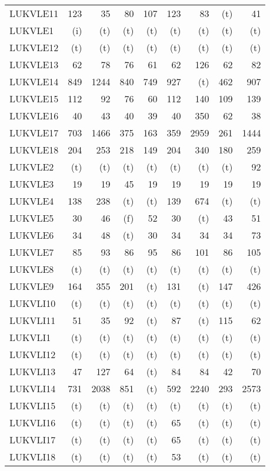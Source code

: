 \documentclass[11pt,twoside]{article}
\begin{document}
{\begin{longtable}[c]{|l|r|r|r|r|r|r|r|r|}
 LUKVLE11 & 123 & 35 & 80 & 107 & 123 & 83 & (t) & 41 \\
 LUKVLE1 & (i) & (t) & (t) & (t) & (t) & (t) & (t) & (t) \\
 LUKVLE12 & (t) & (t) & (t) & (t) & (t) & (t) & (t) & (t) \\
 LUKVLE13 & 62 & 78 & 76 & 61 & 62 & 126 & 62 & 82 \\
 LUKVLE14 & 849 & 1244 & 840 & 749 & 927 & (t) & 462 & 907 \\
 LUKVLE15 & 112 & 92 & 76 & 60 & 112 & 140 & 109 & 139 \\
 LUKVLE16 & 40 & 43 & 40 & 39 & 40 & 350 & 62 & 38 \\
 LUKVLE17 & 703 & 1466 & 375 & 163 & 359 & 2959 & 261 & 1444 \\
 LUKVLE18 & 204 & 253 & 218 & 149 & 204 & 340 & 180 & 259 \\
 LUKVLE2 & (t) & (t) & (t) & (t) & (t) & (t) & (t) & 92 \\
 LUKVLE3 & 19 & 19 & 45 & 19 & 19 & 19 & 19 & 19 \\
 LUKVLE4 & 138 & 238 & (t) & (t) & 139 & 674 & (t) & (t) \\
 LUKVLE5 & 30 & 46 & (f) & 52 & 30 & (t) & 43 & 51 \\
 LUKVLE6 & 34 & 48 & (t) & 30 & 34 & 34 & 34 & 73 \\
 LUKVLE7 & 85 & 93 & 86 & 95 & 86 & 101 & 86 & 105 \\
 LUKVLE8 & (t) & (t) & (t) & (t) & (t) & (t) & (t) & (t) \\
 LUKVLE9 & 164 & 355 & 201 & (t) & 131 & (t) & 147 & 426 \\
 LUKVLI10 & (t) & (t) & (t) & (t) & (t) & (t) & (t) & (t) \\
 LUKVLI11 & 51 & 35 & 92 & (t) & 87 & (t) & 115 & 62 \\
 LUKVLI1 & (t) & (t) & (t) & (t) & (t) & (t) & (t) & (t) \\
 LUKVLI12 & (t) & (t) & (t) & (t) & (t) & (t) & (t) & (t) \\
 LUKVLI13 & 47 & 127 & 64 & (t) & 84 & 84 & 42 & 70 \\
 LUKVLI14 & 731 & 2038 & 851 & (t) & 592 & 2240 & 293 & 2573 \\
 LUKVLI15 & (t) & (t) & (t) & (t) & (t) & (t) & (t) & (t) \\
 LUKVLI16 & (t) & (t) & (t) & (t) & 65 & (t) & (t) & (t) \\
 LUKVLI17 & (t) & (t) & (t) & (t) & 65 & (t) & (t) & (t) \\
 LUKVLI18 & (t) & (t) & (t) & (t) & 53 & (t) & (t) & (t) \\

\end{longtable}}
\end{document}
